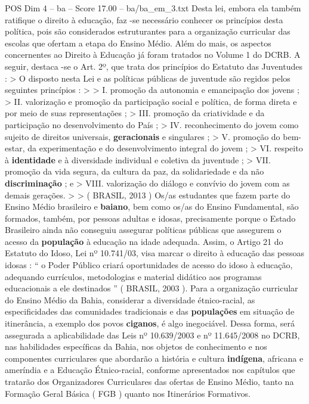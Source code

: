 \begin{textsample}{POS Dim 4 – ba – Score 17.00 – ba/ba\_em\_3.txt}
Desta lei, embora ela também ratifique o direito à educação, faz -se necessário conhecer os princípios desta política, pois são considerados estruturantes para a organização curricular das escolas que ofertam a etapa do Ensino Médio.
Além do mais, os aspectos concernentes ao Direito à Educação já foram tratados no Volume 1 do DCRB.
A seguir, destaca -se o Art. 2º, que trata dos princípios do Estatuto das Juventudes : > O disposto nesta Lei e as políticas públicas de juventude são regidos pelos seguintes princípios : > > I. promoção da autonomia e emancipação dos jovens ; > II. valorização e promoção da participação social e política, de forma direta e por meio de suas representações ; > III. promoção da criatividade e da participação no desenvolvimento do País ; > IV. reconhecimento do jovem como sujeito de direitos universais, \textbf{geracionais} e singulares ; > V. promoção do bem-estar, da experimentação e do desenvolvimento integral do jovem ; > VI. respeito à \textbf{identidade} e à diversidade individual e coletiva da juventude ; > VII. promoção da vida segura, da cultura da paz, da solidariedade e da não \textbf{discriminação} ; e > VIII. valorização do diálogo e convívio do jovem com as demais gerações. > > ( BRASIL, 2013 ) Os/as estudantes que fazem parte do Ensino Médio brasileiro e \textbf{baiano}, bem como os/as do Ensino Fundamental, são formados, também, por pessoas adultas e idosas, precisamente porque o Estado Brasileiro ainda não conseguiu assegurar políticas públicas que assegurem o acesso da \textbf{população} à educação na idade adequada.
Assim, o Artigo 21 do Estatuto do Idoso, Lei nº 10.741/03, visa marcar o direito à educação das pessoas idosas : “ o Poder Público criará oportunidades de acesso do idoso à educação, adequando currículos, metodologias e material didático aos programas educacionais a ele destinados ” ( BRASIL, 2003 ).
Para a organização curricular do Ensino Médio da Bahia, considerar a diversidade étnico-racial, as especificidades das comunidades tradicionais e das \textbf{populações} em situação de itinerância, a exemplo dos povos \textbf{ciganos}, é algo inegociável.
Dessa forma, será assegurada a aplicabilidade das Leis nº 10.639/2003 e nº 11.645/2008 no DCRB, nas habilidades específicas da Bahia, nos objetos de conhecimento e nos componentes curriculares que abordarão a história e cultura \textbf{indígena}, africana e ameríndia e a Educação Étnico-racial, conforme apresentados nos capítulos que tratarão dos Organizadores Curriculares das ofertas de Ensino Médio, tanto na Formação Geral Básica ( FGB ) quanto nos Itinerários Formativos.

\end{textsample}

